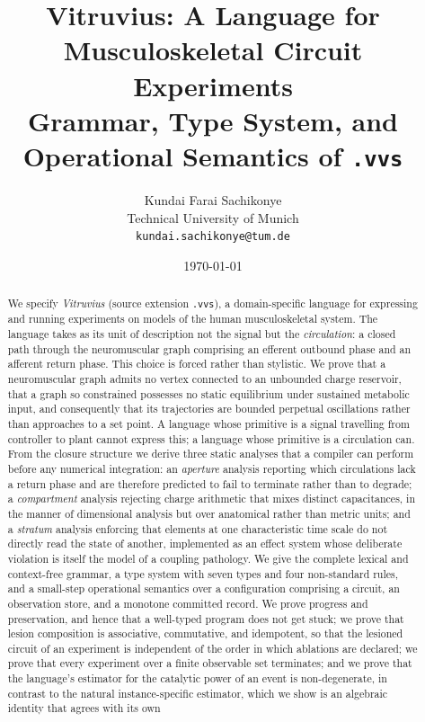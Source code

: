 \documentclass[11pt,twocolumn,a4paper]{article}
\title{\textbf{Vitruvius: A Language for Musculoskeletal Circuit
Experiments}\\[4pt]
\large Grammar, Type System, and Operational Semantics of \texttt{.vvs}}
\author{%
Kundai Farai Sachikonye\\
\small Technical University of Munich\\
\small \texttt{kundai.sachikonye@tum.de}}
\date{\today}
\theoremstyle{thmstyle}
\theoremstyle{definition}
\theoremstyle{remark}
\begin{document}
\maketitle

\begin{abstract}
\noindent
We specify \emph{Vitruvius} (source extension \texttt{.vvs}), a domain-specific
language for expressing and running experiments on models of the human
musculoskeletal system. The language takes as its unit of description not the
signal but the \emph{circulation}: a closed path through the neuromuscular
graph comprising an efferent outbound phase and an afferent return phase. This
choice is forced rather than stylistic. We prove that a neuromuscular graph
admits no vertex connected to an unbounded charge reservoir, that a graph so
constrained possesses no static equilibrium under sustained metabolic input,
and consequently that its trajectories are bounded perpetual oscillations
rather than approaches to a set point. A language whose primitive is a signal
travelling from controller to plant cannot express this; a language whose
primitive is a circulation can. From the closure structure we derive three
static analyses that a compiler can perform before any numerical integration:
an \emph{aperture} analysis reporting which circulations lack a return phase
and are therefore predicted to fail to terminate rather than to degrade; a
\emph{compartment} analysis rejecting charge arithmetic that mixes distinct
capacitances, in the manner of dimensional analysis but over anatomical rather
than metric units; and a \emph{stratum} analysis enforcing that elements at
one characteristic time scale do not directly read the state of another,
implemented as an effect system whose deliberate violation is itself the model
of a coupling pathology. We give the complete lexical and context-free grammar,
a type system with seven types and four non-standard rules, and a small-step
operational semantics over a configuration comprising a circuit, an observation
store, and a monotone committed record. We prove progress and preservation, and
hence that a well-typed program does not get stuck; we prove that lesion
composition is associative, commutative, and idempotent, so that the lesioned
circuit of an experiment is independent of the order in which ablations are
declared; we prove that every experiment over a finite observable set
terminates; and we prove that the language's estimator for the catalytic power
of an event is non-degenerate, in contrast to the natural instance-specific
estimator, which we show is an algebraic identity that agrees with its own

\end{abstract}
\end{document}
